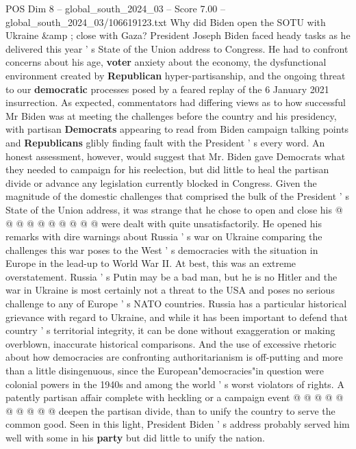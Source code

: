 \begin{textsample}{POS Dim 8 – global\_south\_2024\_03 – Score 7.00 – global\_south\_2024\_03/106619123.txt}  \label{ex:f8_pos_098}
Why did Biden open the SOTU with Ukraine \&amp ; close with Gaza?
President Joseph Biden faced heady tasks as he delivered this year ' s State of the Union address to Congress.
He had to confront concerns about his age, \textbf{voter} anxiety about the economy, the dysfunctional environment created by \textbf{Republican} hyper-partisanship, and the ongoing threat to our \textbf{democratic} processes posed by a feared replay of the 6 January 2021 insurrection.
As expected, commentators had differing views as to how successful Mr Biden was at meeting the challenges before the country and his presidency, with partisan \textbf{Democrats} appearing to read from Biden campaign talking points and \textbf{Republicans} glibly finding fault with the President ' s every word.
An honest assessment, however, would suggest that Mr.
Biden gave Democrats what they needed to campaign for his reelection, but did little to heal the partisan divide or advance any legislation currently blocked in Congress.
Given the magnitude of the domestic challenges that comprised the bulk of the President ' s State of the Union address, it was strange that he chose to open and close his @ @ @ @ @ @ @ @ @ @ were dealt with quite unsatisfactorily.
He opened his remarks with dire warnings about Russia ' s war on Ukraine comparing the challenges this war poses to the West ' s democracies with the situation in Europe in the lead-up to World War II.
At best, this was an extreme overstatement.
Russia ' s Putin may be a bad man, but he is no Hitler and the war in Ukraine is most certainly not a threat to the USA and poses no serious challenge to any of Europe ' s NATO countries.
Russia has a particular historical grievance with regard to Ukraine, and while it has been important to defend that country ' s territorial integrity, it can be done without exaggeration or making overblown, inaccurate historical comparisons.
And the use of excessive rhetoric about how democracies are confronting authoritarianism is off-putting and more than a little disingenuous, since the European"democracies"in question were colonial powers in the 1940s and among the world ' s worst violators of rights.
A patently partisan affair complete with heckling or a campaign event @ @ @ @ @ @ @ @ @ @ deepen the partisan divide, than to unify the country to serve the common good.
Seen in this light, President Biden ' s address probably served him well with some in his \textbf{party} but did little to unify the nation.

\end{textsample}
